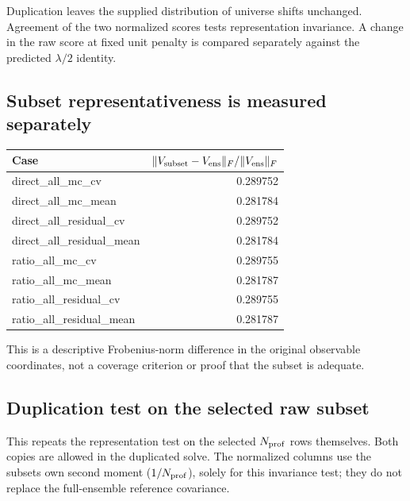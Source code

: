 Duplication leaves the supplied distribution of universe shifts unchanged. Agreement of the two normalized scores tests representation invariance. A change in the raw score at fixed unit penalty is compared separately against the predicted $\lambda/2$ identity.

\subsection{Subset representativeness is measured separately}

\begin{center}\small\begin{tabular}{lr}\toprule

Case & $\|V_{\rm subset}-V_{\rm ens}\|_F/\|V_{\rm ens}\|_F$\\\midrule

direct\_all\_mc\_cv & 0.289752\\

direct\_all\_mc\_mean & 0.281784\\

direct\_all\_residual\_cv & 0.289752\\

direct\_all\_residual\_mean & 0.281784\\

ratio\_all\_mc\_cv & 0.289755\\

ratio\_all\_mc\_mean & 0.281787\\

ratio\_all\_residual\_cv & 0.289755\\

ratio\_all\_residual\_mean & 0.281787\\

\bottomrule\end{tabular}\end{center}

This is a descriptive Frobenius-norm difference in the original observable coordinates, not a coverage criterion or proof that the subset is adequate.

\subsection{Duplication test on the selected raw subset}

This repeats the representation test on the selected $N_{\rm prof}$ rows themselves. Both copies are allowed in the duplicated solve. The normalized columns use the subset\textquotesingle s own second moment ($1/N_{\rm prof}$), solely for this invariance test; they do not replace the full-ensemble reference covariance.

